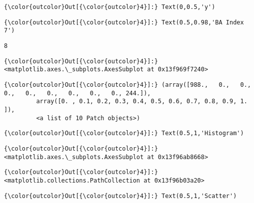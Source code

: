 \documentclass[11pt]{article}
\begin{document}
\begin{Verbatim}[commandchars=\\\{\}]
{\color{outcolor}Out[{\color{outcolor}4}]:} Text(0,0.5,'y')
\end{Verbatim}
            
\begin{Verbatim}[commandchars=\\\{\}]
{\color{outcolor}Out[{\color{outcolor}4}]:} Text(0.5,0.98,'BA Index 7')
\end{Verbatim}
            
    \begin{Verbatim}[commandchars=\\\{\}]
8

    \end{Verbatim}

\begin{Verbatim}[commandchars=\\\{\}]
{\color{outcolor}Out[{\color{outcolor}4}]:} <matplotlib.axes.\_subplots.AxesSubplot at 0x13f969f7240>
\end{Verbatim}
            
\begin{Verbatim}[commandchars=\\\{\}]
{\color{outcolor}Out[{\color{outcolor}4}]:} (array([988.,   0.,   0.,   0.,   0.,   0.,   0.,   0.,   0., 244.]),
         array([0. , 0.1, 0.2, 0.3, 0.4, 0.5, 0.6, 0.7, 0.8, 0.9, 1. ]),
         <a list of 10 Patch objects>)
\end{Verbatim}
            
\begin{Verbatim}[commandchars=\\\{\}]
{\color{outcolor}Out[{\color{outcolor}4}]:} Text(0.5,1,'Histogram')
\end{Verbatim}
            
\begin{Verbatim}[commandchars=\\\{\}]
{\color{outcolor}Out[{\color{outcolor}4}]:} <matplotlib.axes.\_subplots.AxesSubplot at 0x13f96ab8668>
\end{Verbatim}
            
\begin{Verbatim}[commandchars=\\\{\}]
{\color{outcolor}Out[{\color{outcolor}4}]:} <matplotlib.collections.PathCollection at 0x13f96b03a20>
\end{Verbatim}
            
\begin{Verbatim}[commandchars=\\\{\}]
{\color{outcolor}Out[{\color{outcolor}4}]:} Text(0.5,1,'Scatter')
\end{Verbatim}
            
\end{document}
